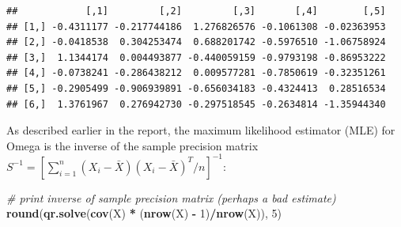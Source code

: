 \documentclass[12pt,]{book}
\newenvironment{Shaded}{\begin{snugshade}}{\end{snugshade}}
\newcommand{\CommentTok}[1]{\textcolor[rgb]{0.56,0.35,0.01}{\textit{#1}}}
\newcommand{\DataTypeTok}[1]{\textcolor[rgb]{0.13,0.29,0.53}{#1}}
\newcommand{\DecValTok}[1]{\textcolor[rgb]{0.00,0.00,0.81}{#1}}
\newcommand{\FloatTok}[1]{\textcolor[rgb]{0.00,0.00,0.81}{#1}}
\newcommand{\KeywordTok}[1]{\textcolor[rgb]{0.13,0.29,0.53}{\textbf{#1}}}
\newcommand{\NormalTok}[1]{#1}
\newcommand{\OperatorTok}[1]{\textcolor[rgb]{0.81,0.36,0.00}{\textbf{#1}}}
\newcommand{\OtherTok}[1]{\textcolor[rgb]{0.56,0.35,0.01}{#1}}
\newcommand{\StringTok}[1]{\textcolor[rgb]{0.31,0.60,0.02}{#1}}
\theoremstyle{definition}
\theoremstyle{definition}
\theoremstyle{definition}
\theoremstyle{remark}
\begin{document}
\begin{Shaded}
\end{Shaded}

\begin{verbatim}
##            [,1]         [,2]         [,3]       [,4]        [,5]
## [1,] -0.4311177 -0.217744186  1.276826576 -0.1061308 -0.02363953
## [2,] -0.0418538  0.304253474  0.688201742 -0.5976510 -1.06758924
## [3,]  1.1344174  0.004493877 -0.440059159 -0.9793198 -0.86953222
## [4,] -0.0738241 -0.286438212  0.009577281 -0.7850619 -0.32351261
## [5,] -0.2905499 -0.906939891 -0.656034183 -0.4324413  0.28516534
## [6,]  1.3761967  0.276942730 -0.297518545 -0.2634814 -1.35944340
\end{verbatim}

\vspace{0.5cm}

As described earlier in the report, the maximum likelihood estimator
(MLE) for Omega is the inverse of the sample precision matrix
\(S^{-1} = \left[\sum_{i = 1}^{n}(X_{i} - \bar{X})(X_{i} - \bar{X})^{T}/n \right]^{-1}\):

\vspace{0.5cm}

\begin{Shaded}
\begin{Highlighting}[]
\CommentTok{# print inverse of sample precision matrix (perhaps a bad estimate)}
\KeywordTok{round}\NormalTok{(}\KeywordTok{qr.solve}\NormalTok{(}\KeywordTok{cov}\NormalTok{(X) }\OperatorTok{*}\StringTok{ }\NormalTok{(}\KeywordTok{nrow}\NormalTok{(X) }\OperatorTok{-}\StringTok{ }\DecValTok{1}\NormalTok{)}\OperatorTok{/}\KeywordTok{nrow}\NormalTok{(X)), }\DecValTok{5}\NormalTok{)}
\end{Highlighting}
\end{Shaded}
\end{document}
